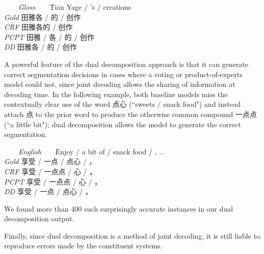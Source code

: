\begin{footnotesize}
\begin{tabbing}
\ \ \ \ \= \emph{Gloss}\ \ \ \ \= Tian Yage / 's / creations \\
\> \emph{Gold} \>   田雅各 / 的 / 创作 \\
\> \emph{CRF} \>  田雅各的 / 创作 \\
\> \emph{PCPT} \>  田雅 / 各 / 的 / 创作 \\
\> \emph{DD} \>  田雅各 / 的 / 创作 \\
\end{tabbing}
\end{footnotesize}

A powerful feature of the dual decomposition approach is that it can generate correct segmentation decisions in cases where a voting or product-of-experts model could not, since joint decoding allows the sharing of information at decoding time. In the following example, both baseline models miss the contextually clear use of the word 点心 (``sweets / snack food") and instead attach 点 to the prior word to produce the otherwise common compound 一点点 (``a little bit"); dual decomposition allows the model to generate the correct segmentation.
\begin{footnotesize}
\begin{tabbing}
\ \ \ \ \= \emph{English}\ \ \ \ \= Enjoy / a bit of / snack food / , ... \\
\> \emph{Gold} \>  享受 / 一点 / 点心 /  ，\\
\> \emph{CRF} \> 享受 / 一点点 / 心 / ，\\
\> \emph{PCPT} \> 享受 / 一点点 / 心 / ， \\
\> \emph{DD} \>  享受 / 一点 / 点心 / ，\\
\end{tabbing}
\end{footnotesize}\vspace{-3mm}
We found more than 400 such surprisingly accurate instances in our dual decomposition output.

Finally, since dual decomposition is a method of joint decoding, it is still liable to reproduce errors made by the constituent systems. 


